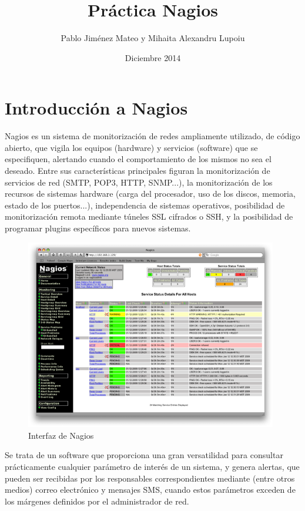 \documentclass[11pt,a4paper]{article}
\title{Práctica Nagios}
\author{Pablo Jiménez Mateo y Mihaita Alexandru Lupoiu}
\date{Diciembre 2014}
\begin{document}
\maketitle
\tableofcontents
\clearpage

\section{Introducción a Nagios}

    Nagios es un sistema de monitorización de redes ampliamente utilizado, de código abierto, que vigila los equipos (hardware) y servicios (software) que se especifiquen, alertando cuando el comportamiento de los mismos no sea el deseado. Entre sus características principales figuran la monitorización de servicios de red (SMTP, POP3, HTTP, SNMP...), la monitorización de los recursos de sistemas hardware (carga del procesador, uso de los discos, memoria, estado de los puertos...), independencia de sistemas operativos, posibilidad de monitorización remota mediante túneles SSL cifrados o SSH, y la posibilidad de programar plugins específicos para nuevos sistemas\cite{nagios-wikipedia}.
    
\begin{figure}[hbtp]
\centerline{\includegraphics[width=11cm]{images/nagios3-1.png}}
\caption{Interfaz de Nagios}
\label{figura-Nagios}
\end{figure}    

    Se trata de un software que proporciona una gran versatilidad para consultar prácticamente cualquier parámetro de interés de un sistema, y genera alertas, que pueden ser recibidas por los responsables correspondientes mediante (entre otros medios) correo electrónico y mensajes SMS, cuando estos parámetros exceden de los márgenes definidos por el administrador de red.
\end{document}
